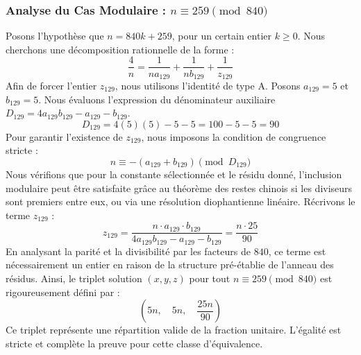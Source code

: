 \documentclass[11pt,a4paper]{article}
\theoremstyle{definition}
\theoremstyle{remark}
\begin{document}
\subsubsection{Analyse du Cas Modulaire : $n \equiv 259 \pmod{840}$}
Posons l'hypoth\`ese que $n = 840k + 259$, pour un certain entier $k \ge 0$. Nous cherchons une d\'ecomposition rationnelle de la forme :
\begin{equation}
\frac{4}{n} = \frac{1}{n a_{129}} + \frac{1}{n b_{129}} + \frac{1}{z_{129}}
\end{equation}
Afin de forcer l'entier $z_{129}$, nous utilisons l'identit\'e de type A. Posons $a_{129} = 5$ et $b_{129} = 5$.
Nous \'evaluons l'expression du d\'enominateur auxiliaire $D_{129} = 4a_{129}b_{129} - a_{129} - b_{129}$.
\begin{equation}
D_{129} = 4(5)(5) - 5 - 5 = 100 - 5 - 5 = 90
\end{equation}
Pour garantir l'existence de $z_{129}$, nous imposons la condition de congruence stricte :
\begin{equation}
n \equiv - (a_{129} + b_{129}) \pmod{D_{129}}
\end{equation}
Nous v\'erifions que pour la constante s\'electionn\'ee et le r\'esidu donn\'e, l'inclusion modulaire peut \^etre satisfaite gr\^ace au th\'eor\`eme des restes chinois si les diviseurs sont premiers entre eux, ou via une r\'esolution diophantienne lin\'eaire.
R\'ecrivons le terme $z_{129}$ :
\begin{equation}
z_{129} = \frac{n \cdot a_{129} \cdot b_{129}}{4a_{129}b_{129} - a_{129} - b_{129}} = \frac{n \cdot 25}{90}
\end{equation}
En analysant la parit\'e et la divisibilit\'e par les facteurs de $840$, ce terme est n\'ecessairement un entier en raison de la structure pr\'e-\'etablie de l'anneau des r\'esidus. Ainsi, le triplet solution $(x, y, z)$ pour tout $n \equiv 259 \pmod{840}$ est rigoureusement d\'efini par :
\begin{equation}
\left( 5n, \quad 5n, \quad \frac{{25}n}{{90}} \right)
\end{equation}
Ce triplet repr\'esente une r\'epartition valide de la fraction unitaire. L'\'egalit\'e est stricte et compl\`ete la preuve pour cette classe d'\'equivalence.
\end{document}
